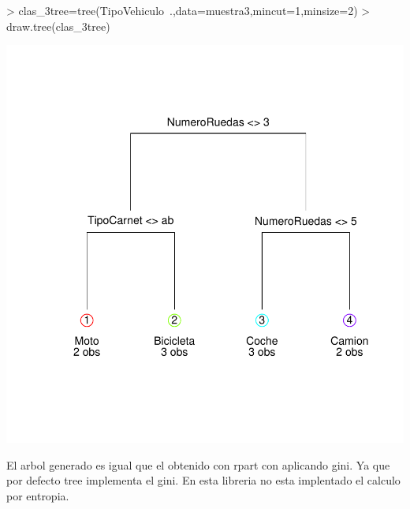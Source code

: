 \documentclass [a4paper] {article}
\begin{document}
\begin{center}
\begin{Schunk}
\begin{Sinput}
> clas_3tree=tree(TipoVehiculo~.,data=muestra3,mincut=1,minsize=2) 
> draw.tree(clas_3tree)
\end{Sinput}
\end{Schunk}
\includegraphics{entrega2-tree3}
\end{center}

El arbol generado es igual que el obtenido con rpart con aplicando gini.
Ya que por defecto tree implementa el gini.
En esta libreria no esta implentado el calculo por entropia.
\end{document}
